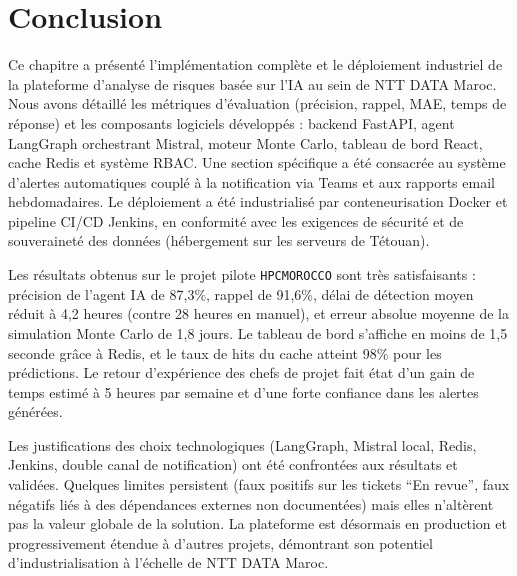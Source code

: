 \section{Conclusion}
Ce chapitre a présenté l’implémentation complète et le déploiement industriel de la plateforme d’analyse de risques basée sur l’IA au sein de NTT DATA Maroc. Nous avons détaillé les métriques d’évaluation (précision, rappel, MAE, temps de réponse) et les composants logiciels développés : backend FastAPI, agent LangGraph orchestrant Mistral, moteur Monte Carlo, tableau de bord React, cache Redis et système RBAC. Une section spécifique a été consacrée au système d’alertes automatiques couplé à la notification via Teams et aux rapports email hebdomadaires. Le déploiement a été industrialisé par conteneurisation Docker et pipeline CI/CD Jenkins, en conformité avec les exigences de sécurité et de souveraineté des données (hébergement sur les serveurs de Tétouan).

Les résultats obtenus sur le projet pilote \texttt{HPCMOROCCO} sont très satisfaisants : précision de l’agent IA de 87,3\%, rappel de 91,6\%, délai de détection moyen réduit à 4,2 heures (contre 28 heures en manuel), et erreur absolue moyenne de la simulation Monte Carlo de 1,8 jours. Le tableau de bord s’affiche en moins de 1,5 seconde grâce à Redis, et le taux de hits du cache atteint 98\% pour les prédictions. Le retour d’expérience des chefs de projet fait état d’un gain de temps estimé à 5 heures par semaine et d’une forte confiance dans les alertes générées.

Les justifications des choix technologiques (LangGraph, Mistral local, Redis, Jenkins, double canal de notification) ont été confrontées aux résultats et validées. Quelques limites persistent (faux positifs sur les tickets “En revue”, faux négatifs liés à des dépendances externes non documentées) mais elles n’altèrent pas la valeur globale de la solution. La plateforme est désormais en production et progressivement étendue à d’autres projets, démontrant son potentiel d’industrialisation à l’échelle de NTT DATA Maroc.